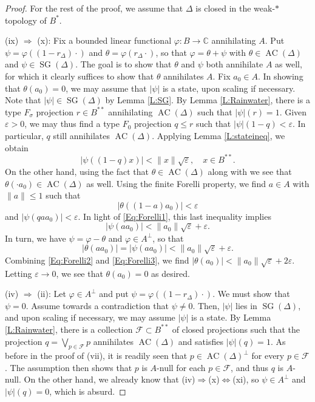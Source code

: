 \documentclass[10pt]{amsart}
\newcommand{\bC}{{\mathbb{C}}}
\newcommand{\F}{{\mathcal{F}}}
\newcommand{\eps}{\varepsilon}
\renewcommand{\phi}{\varphi}
\newcommand{\AC}{\operatorname{AC}}
\newcommand{\SG}{\operatorname{SG}}
\theoremstyle{definition}
\begin{document}
\begin{proof}
For the rest of the proof, we assume that $\Delta$ is closed in the weak-$*$ topology of $B^*$.

(ix) $\Rightarrow$ (x): Fix a bounded linear functional $\phi:B\to \bC$ annihilating $A$. Put $\psi=\phi((1-r_\Delta)\cdot)$ and $\theta=\phi(r_\Delta \cdot)$, so that $\phi=\theta+\psi$ with $\theta\in \AC(\Delta)$ and $\psi\in \SG(\Delta)$. The goal is to show that $\theta$ and $\psi$ both annihilate $A$ as well, for which it clearly suffices to show that $\theta$ annihilates $A$.  Fix $a_0\in A$. 
In showing that $\theta(a_0)=0$, we may assume that $|\psi|$ is a state, upon scaling if necessary. Note that $|\psi|\in \SG(\Delta)$ by Lemma \ref{L:SG}.
By Lemma \ref{L:Rainwater}, there is a type $F_\sigma$ projection
$r\in B^{**}$ annihilating $\AC(\Delta)$ such that 
$
|\psi|(r) = 1.
$ 
Given $\eps>0$, we may thus find a type $F_0$ projection $q\leq r$ such that $|\psi|(1-q)<\eps$. In particular, $q$ still annihilates $\AC(\Delta)$. Applying  Lemma \ref{L:stateineq}, we obtain
\begin{equation}\label{Eq:Forelli1}
|\psi((1-q)x)|< \|x\| \sqrt{\eps}, \quad x\in B^{**}.
\end{equation}
On the other hand, using the fact that $\theta\in \AC(\Delta)$ along with \cite[Lemma 2.5]{CT2023Henkin} we see that $\theta(\cdot a_0)\in \AC(\Delta)$ as well. 
Using the  finite Forelli property, we find  $a \in A$ with $\|a\|\leq 1$ such that 
\begin{equation}\label{Eq:Forelli2}
|\theta((1-a)a_0)|<\eps
\end{equation}
and $|\psi(qaa_0)|<\eps$. In light of \eqref{Eq:Forelli1}, this last inequality implies
\[
|\psi(aa_0)| <\|a_0\|\sqrt{\eps}+\eps.
\]
In turn, we have $\psi=\phi-\theta$ and  $\phi\in A^\perp$, so that
\begin{equation}\label{Eq:Forelli3}
|\theta(aa_0)|=|\psi(aa_0)|<\|a_0\|\sqrt{\eps}+\eps.
\end{equation}
Combining \eqref{Eq:Forelli2} and \eqref{Eq:Forelli3}, we find $|\theta(a_0)|<\|a_0\|\sqrt{\eps}+2\eps$.
 Letting $\eps\to 0$, we see that $\theta(a_0)=0$ as desired.


(iv) $\Rightarrow$ (ii): Let $\phi\in A^\perp$ and put $\psi=\phi((1-r_\Delta)\cdot)$. We must show that $\psi=0$. Assume towards a contradiction that $\psi\neq 0$. Then, $|\psi|$ lies in $\SG(\Delta)$, and upon scaling if necessary, we may assume $|\psi|$ is a state.  By Lemma \ref{L:Rainwater}, there is a collection $\F\subset B^{**}$ of closed projections such that the projection $q=\bigvee_{p\in \F} p$ annihilates $\AC(\Delta)$ and satisfies $|\psi|(q)=1$. As before in the proof of (vii), 
 it is readily seen that $p\in \AC(\Delta)^{\perp}$ for every $p\in \F$. The assumption then shows that $p$ is $A$-null for each $p\in \F$, and 
 thus $q$ is $A$-null. On the other hand, we already know that (iv)$\Rightarrow$(x)$\Leftrightarrow$(xi), so $\psi\in A^\perp$ and $|\psi|(q)=0$, which is absurd.
\end{proof}
\end{document}

